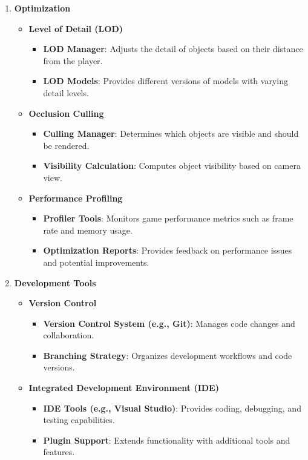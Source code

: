 \begin{enumerate}
	\item \textbf{Optimization}
	\begin{itemize}
		\item \textbf{Level of Detail (LOD)}
		\begin{itemize}
			\item \textbf{LOD Manager}: Adjusts the detail of objects based on their distance from the player.
			\item \textbf{LOD Models}: Provides different versions of models with varying detail levels.
		\end{itemize}
		\item \textbf{Occlusion Culling}
		\begin{itemize}
			\item \textbf{Culling Manager}: Determines which objects are visible and should be rendered.
			\item \textbf{Visibility Calculation}: Computes object visibility based on camera view.
		\end{itemize}
		\item \textbf{Performance Profiling}
		\begin{itemize}
			\item \textbf{Profiler Tools}: Monitors game performance metrics such as frame rate and memory usage.
			\item \textbf{Optimization Reports}: Provides feedback on performance issues and potential improvements.
		\end{itemize}
	\end{itemize}
	\item \textbf{Development Tools}
	\begin{itemize}
		\item \textbf{Version Control}
		\begin{itemize}
			\item \textbf{Version Control System (e.g., Git)}: Manages code changes and collaboration.
			\item \textbf{Branching Strategy}: Organizes development workflows and code versions.
		\end{itemize}
		\item \textbf{Integrated Development Environment (IDE)}
		\begin{itemize}
			\item \textbf{IDE Tools (e.g., Visual Studio)}: Provides coding, debugging, and testing capabilities.
			\item \textbf{Plugin Support}: Extends functionality with additional tools and features.
		\end{itemize}
	\end{itemize}
\end{enumerate}


